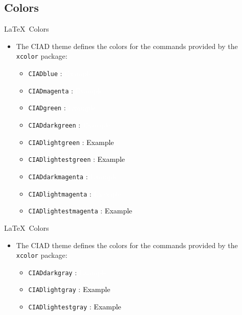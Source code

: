\documentclass[english,sectioncirclenumberstyle]{ciadbeamer}
\begin{document}
\subsection{Colors}

\begin{frame}{{\LaTeX}\ Colors}
	\begin{itemize}
	\item The CIAD theme defines the colors for the commands provided by the \texttt{xcolor} package:
		\begin{itemize}
		\item \texttt{CIADblue} : \fbox{\textcolor{CIADblue}{Example}} \colorbox{CIADblue}{\textcolor{white}{Example}}
		\item \texttt{CIADmagenta} : \fbox{\textcolor{CIADmagenta}{Example}} \colorbox{CIADmagenta}{\textcolor{white}{Example}}
		\item \texttt{CIADgreen} : \fbox{\textcolor{CIADgreen}{Example}} \colorbox{CIADgreen}{\textcolor{white}{Example}}
		\item \texttt{CIADdarkgreen} : \fbox{\textcolor{CIADdarkgreen}{Example}} \colorbox{CIADdarkgreen}{\textcolor{white}{Example}}
		\item \texttt{CIADlightgreen} : \fbox{\textcolor{CIADlightgreen}{Example}} \colorbox{CIADlightgreen}{\textcolor{black}{Example}}
		\item \texttt{CIADlightestgreen} : \fbox{\textcolor{CIADlightestgreen}{Example}} \colorbox{CIADlightestgreen}{\textcolor{black}{Example}}
		\item \texttt{CIADdarkmagenta} : \fbox{\textcolor{CIADdarkmagenta}{Example}} \colorbox{CIADdarkmagenta}{\textcolor{white}{Example}}
		\item \texttt{CIADlightmagenta} : \fbox{\textcolor{CIADlightmagenta}{Example}} \colorbox{CIADlightmagenta}{\textcolor{white}{Example}}
		\item \texttt{CIADlightestmagenta} : \fbox{\textcolor{CIADlightestmagenta}{Example}} \colorbox{CIADlightestmagenta}{\textcolor{black}{Example}}
		\end{itemize}
	\end{itemize}
\end{frame}

\begin{frame}{{\LaTeX}\ Colors \insertcontinuationtext}
	\begin{itemize}
	\item The CIAD theme defines the colors for the commands provided by the \texttt{xcolor} package:
		\begin{itemize}
		\item \texttt{CIADdarkgray} : \fbox{\textcolor{CIADdarkgray}{Example}} \colorbox{CIADdarkgray}{\textcolor{white}{Example}}
		\item \texttt{CIADlightgray} : \fbox{\textcolor{CIADlightgray}{Example}} \colorbox{CIADlightgray}{\textcolor{black}{Example}}
		\item \texttt{CIADlightestgray} : \fbox{\textcolor{CIADlightestgray}{Example}} \colorbox{CIADlightestgray}{\textcolor{black}{Example}}
		\end{itemize}
	\end{itemize}
\end{frame}
\end{document}
